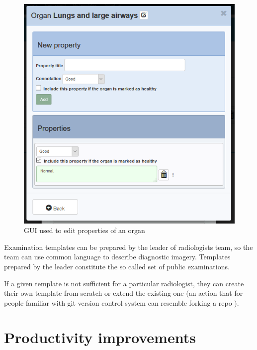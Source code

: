 \documentclass[12pt, twoside, openany]{report}
\theoremstyle{definition}
\begin{document}
\begin{figure}
	  \begin{minipage}{\textwidth}
	\begin{center}
    \includegraphics{template-property-list}
    \caption{GUI used to edit properties of an organ\protect\footnotemark[2] \label{fig:template-property-list}}
    	\end{center}
    \end{minipage}
\end{figure}

Examination templates can be prepared by the leader of radiologists team, so the team can use common language to describe diagnostic imagery. Templates prepared by the leader constitute the so called set of public examinations.

If a given template is not sufficient for a particular radiologist, they can create their own template from scratch or extend the existing one (an action that for people familiar with git version control system can resemble forking a repo \cite{forking}).


\section{Productivity improvements}
\end{document}
